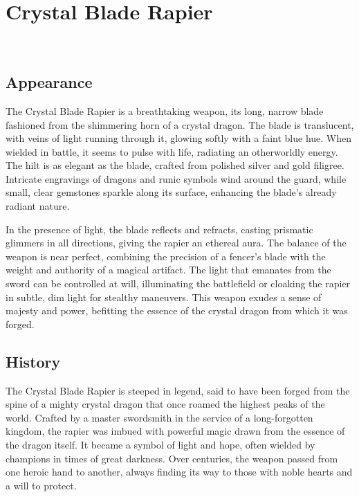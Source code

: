 
\chapter*{Crystal Blade Rapier}
\\

\section*{Appearance}
The Crystal Blade Rapier is a breathtaking weapon, its long, narrow blade fashioned from the shimmering horn of a crystal dragon. The blade is translucent, with veins of light running through it, glowing softly with a faint blue hue. When wielded in battle, it seems to pulse with life, radiating an otherworldly energy. The hilt is as elegant as the blade, crafted from polished silver and gold filigree. Intricate engravings of dragons and runic symbols wind around the guard, while small, clear gemstones sparkle along its surface, enhancing the blade’s already radiant nature.

In the presence of light, the blade reflects and refracts, casting prismatic glimmers in all directions, giving the rapier an ethereal aura. The balance of the weapon is near perfect, combining the precision of a fencer’s blade with the weight and authority of a magical artifact. The light that emanates from the sword can be controlled at will, illuminating the battlefield or cloaking the rapier in subtle, dim light for stealthy maneuvers. This weapon exudes a sense of majesty and power, befitting the essence of the crystal dragon from which it was forged.

\section*{History}
The Crystal Blade Rapier is steeped in legend, said to have been forged from the spine of a mighty crystal dragon that once roamed the highest peaks of the world. Crafted by a master swordsmith in the service of a long-forgotten kingdom, the rapier was imbued with powerful magic drawn from the essence of the dragon itself. It became a symbol of light and hope, often wielded by champions in times of great darkness. Over centuries, the weapon passed from one heroic hand to another, always finding its way to those with noble hearts and a will to protect.

